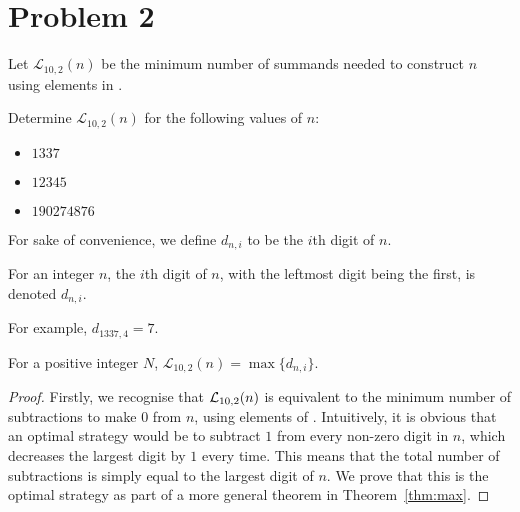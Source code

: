\section{Problem 2}
\begin{definition}
  Let $\mathcal{L}_{10, 2}(n)$ be the minimum number of summands needed to construct $n$ using elements in \NTen.
\end{definition}
\begin{problem}\label{p2}
Determine $\mathcal{L}_{10, 2}(n)$ for the following values of $n$:
\begin{itemize}
  \item $1337$
  \item  $12345$
  \item  $190274876$
\end{itemize}
\end{problem}
For sake of convenience, we define $d_{n, i}$ to be the $i$th digit of $n$.
\begin{definition}
  For an integer $n$, the $i$th digit of  $n$, with the leftmost digit being the first, is denoted $d_{n, i}$.
\end{definition}
For example, $d_{1337, 4} = 7$.
\begin{theorem} \label{thm1}
  For a positive integer $N$, $\mathcal{L}_{10, 2}(n) = \max\{d_{n, i}\}$.
\end{theorem}
\begin{proof}
  Firstly, we recognise that $\mathcal{L}_{10, 2}(n)$ is equivalent to the minimum number of subtractions to make $0$ from $n$, using elements of \NTen. Intuitively, it is obvious that an optimal strategy would be to subtract $1$ from every non-zero digit in $n$, which decreases the largest digit by $1$ every time. This means that the total number of subtractions is simply equal to the largest digit of $n$. We prove that this is the optimal strategy as part of a more general theorem in Theorem~\ref{thm:max}.
\end{proof}
